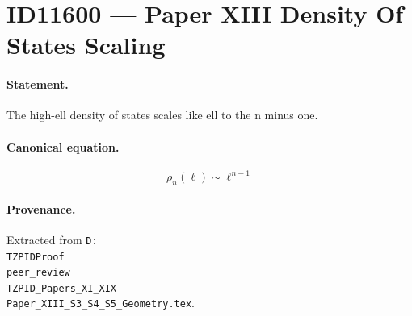 \section*{ID11600 --- Paper XIII Density Of States Scaling}

\paragraph{Statement.}
The high-ell density of states scales like ell to the n minus one.

\paragraph{Canonical equation.}
\[
\rho_n(\ell)\sim\ell^{n-1}
\]

\paragraph{Provenance.}
Extracted from \texttt{D:\\TZPIDProof\\peer\_review\\TZPID\_Papers\_XI\_XIX\\Paper\_XIII\_S3\_S4\_S5\_Geometry.tex}.
